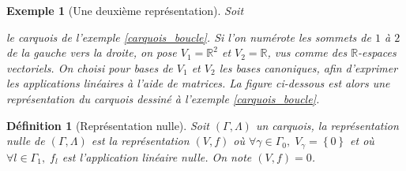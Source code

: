 \documentclass[a4paper,11pt]{article}
\newtheorem{defi}[thm]{Définition}%
\newtheorem{ex}[thm]{Exemple}%
\begin{document}
\begin{ex}[Une deuxième représentation]
	Soit
		le carquois de l'exemple \ref{carquois_boucle}. Si l'on numérote les sommets de $1$ à $2$ de la gauche vers la droite, on pose $V_1=\mathbb R^2$ et $V_2=\mathbb R$, vus comme des $\mathbb R$-espaces vectoriels. On choisi pour bases de $V_1$ et $V_2$ les bases canoniques, afin d'exprimer les applications linéaires à l'aide de matrices. La figure ci-dessous est alors une représentation du carquois dessiné à l'exemple \ref{carquois_boucle}.
		\begin{center}
	\end{center}

\end{ex}
\begin{defi}[Représentation nulle]
	Soit $(\Gamma,\Lambda)$ un carquois, la \emph{représentation nulle} de $(\Gamma,\Lambda)$ est la représentation $(V,f)$ où $\forall\gamma\in\Gamma_{0},\;V_{\gamma}=\left\{ 0 \right\}$ et où $\forall l \in\Gamma_{1},\;f_{l}$ est l'application linéaire nulle. On note $(V,f)=0$.
\end{defi}
\end{document}
